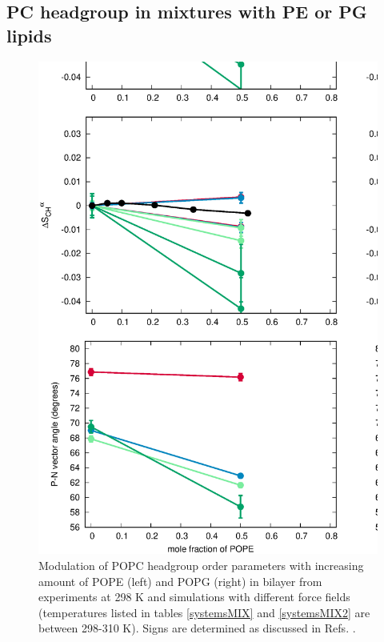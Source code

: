 \documentclass[journal=jpcbfk]{achemso}
\begin{document}
\clearpage

\subsection{PC headgroup in mixtures with PE or PG lipids}
\begin{figure}[]
  \centering
  \includegraphics[width=16.0cm]{./Figs/HGorderparametersPCvsPEPG.eps}
  \caption{\label{HGorderparametersPCvsPEPG}
    Modulation of POPC headgroup order parameters with increasing amount of POPE (left) and POPG (right) in bilayer
    from experiments at 298 K \cite{scherer87,macdonald87} and simulations with different force fields
    (temperatures listed in tables \ref{systemsMIX} and \ref{systemsMIX2} are between 298-310 K).
    Signs are determined as discussed in Refs. .
  }
\end{figure}
\end{document}
